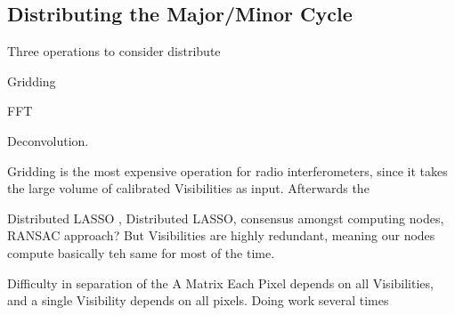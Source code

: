 \subsection{Distributing the Major/Minor Cycle}

Three operations to consider distribute

Gridding

FFT

Deconvolution.

Gridding is the most expensive operation for radio interferometers, since it takes the large volume of calibrated Visibilities as input. 
Afterwards the 


Distributed LASSO
\cite{mateos2010distributed}, Distributed LASSO, consensus amongst computing nodes, RANSAC approach? But Visibilities are highly redundant, meaning our nodes compute basically teh same for most of the time.


Difficulty in separation of the A Matrix
Each Pixel depends on all Visibilities, and a single Visibility depends on all pixels.
Doing work several times






